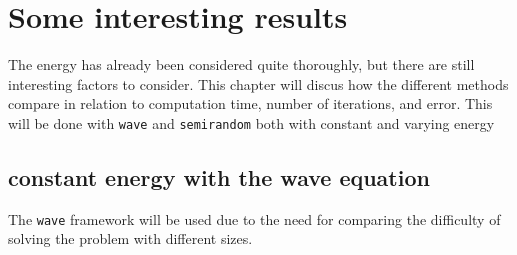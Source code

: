 \chapter{Some interesting results}
The energy has already been considered quite thoroughly, but there are still interesting factors to consider. This chapter will discus how the different methods compare in relation to computation time, number of iterations, and error. This will be done with  \texttt{wave} and \texttt{semirandom} both with constant and varying energy


\section{constant energy with the wave equation}
 The \texttt{wave} framework will be used due to the need for comparing the difficulty of solving the problem with different sizes.\\



